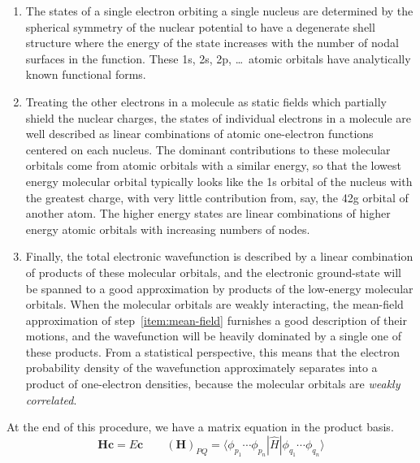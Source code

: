 \begin{enumerate}
    \item
        \label{item:atomic-orbitals}
        The states of a single electron orbiting a single nucleus are determined
        by the spherical symmetry of the nuclear potential to have a degenerate
        shell structure where the energy of the state increases with the number
        of nodal surfaces in the function.
        These 1s, 2s, 2p, \dots\ atomic orbitals have analytically known
        functional forms.
    \item
        \label{item:mean-field}
        Treating the other electrons in a molecule as static fields which
        partially shield the nuclear charges, the states of individual electrons
        in a molecule are well described as linear combinations of atomic
        one-electron functions centered on each nucleus.
        The dominant contributions to these molecular orbitals come from atomic
        orbitals with a similar energy, so that the lowest energy molecular
        orbital typically looks like the 1s orbital of the nucleus with the
        greatest charge, with very little contribution from, say, the 42g
        orbital of another atom.
        The higher energy states are linear combinations of higher energy atomic
        orbitals with increasing numbers of nodes.
    \item
        \label{item:full-ci}
        Finally, the total electronic wavefunction is described by a linear
        combination of products of these molecular orbitals, and the electronic
        ground-state will be spanned to a good approximation by products of the
        low-energy molecular orbitals.
        When the molecular orbitals are weakly interacting, the mean-field
        approximation of step~\ref{item:mean-field} furnishes a good description
        of their motions, and the wavefunction will be heavily dominated by a
        single one of these products.
        From a statistical perspective, this means that the electron probability
        density of the wavefunction approximately separates into a product of
        one-electron densities, because the molecular orbitals are {\itshape
        weakly correlated}.
\end{enumerate}
At the end of this procedure, we have a matrix equation in the product basis.
\begin{equation}
    \mathbf{H}\mathbf{c}
    =
    E\mathbf{c}
    \qquad
    (\mathbf{H})_{PQ}
    =
    \langle \phi_{p_1}\cdots \phi_{p_n}|
    \hat{H}
    |\phi_{q_1}\cdots \phi_{q_n} \rangle
\end{equation}
